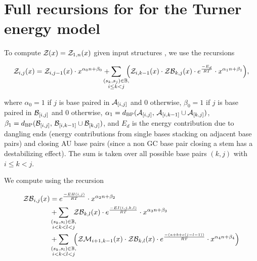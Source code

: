 \documentclass[11pt, oneside]{Thesis} %
\providecommand{\DIFaddbegin}{} %
\providecommand{\DIFaddend}{} %
\providecommand{\DIFdelbegin}{} %
\providecommand{\DIFdelend}{} %
\begin{document}
\DIFdelbegin %
\DIFdelend \DIFaddbegin {}
\DIFaddend 

\section{Full recursions for \texorpdfstring{}{}
for the Turner energy model}
\label{sec:ffttwo:turner}

To compute ${\mathcal Z}_{}(x) = {\mathcal Z}_{1,n}(x)$ given input structures \strAB,
we use the recursions

\begin{align}
\label{eq:ffttwoapp:zx}
\emZ{i,j} = \emZ{i,j-1} \cdot x^{\ab{0}} +
\sum_{\mathclap{\substack{(s_k,s_j) \in \bpSet, \\ i \leq k < j}}}\enspace
\Big( \emZ{i,k-1} \cdot \emZB{k,j} \cdot \boltzE{E_d} \cdot
x^{\ab{1}} \Big),
\end{align}

where
$\alpha_0 = 1$ if $j$ is base paired in $\mathcal A_{[i,j]}$ and $0$ otherwise,
$\beta_0 = 1$ if $j$ is base paired in $\mathcal B_{[i,j]}$ and $0$ otherwise,
$\alpha_1 = d_{\text{BP}}(\mathcal A_{[i,j]},\,\mathcal A_{[i,k-1]} \cup \mathcal A_{[k,j]})$,
$\beta_1 = d_{\text{BP}}(\mathcal B_{[i,j]},\,\mathcal B_{[i,k-1]} \cup \mathcal B_{[k,j]})$,
and $E_d$ is the energy contribution due to dangling ends (energy
contributions from single bases stacking on adjacent base pairs) and
closing AU base pairs (since a non GC base pair closing a stem has a
destabilizing effect).  The sum is taken over all possible
base pairs $(k,j)$ with $i \leq k < j$.

We compute \emZB{} using the recursion

\begin{align}
\label{eq:ffttwoapp:zbx}
\begin{split}
\emZB{i,j} &= \boltzE{EH(i,j)} \cdot x^{\ab{2}} \\
&+ \sum_{\mathclap{\substack{(s_k,s_l) \in \bpSet, \\ i < k < l < j }}}\enspace
\emZB{k,l} \cdot \boltzE{EI(i,j,k,l)} \cdot x^{\ab{3}} \\
&+ \sum_{\mathclap{\substack{(s_k,s_l) \in \bpSet, \\ i < k < l < j }}}\enspace
\Big( \emZM{i+1,k-1} \cdot \emZB{k,l} \cdot \boltzE{(a+b+c(j-l-1))}
\cdot x^{\ab{4}} \Big)
\end{split}
\end{align}
\end{document}
